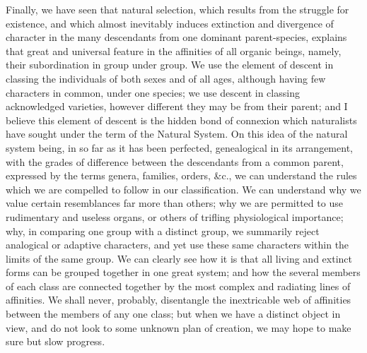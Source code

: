 \indent Finally, we have seen that natural selection, which results from the struggle for existence, and which almost inevitably induces extinction and divergence of character in the many descendants from one dominant parent-species, explains that great and universal feature in the affinities of all organic beings, namely, their subordination in group under group. We use the element of descent in classing the individuals of both sexes and of all ages, although having few characters in common, under one species; we use descent in classing acknowledged varieties, however different they may be from their parent; and I believe this element of descent is the hidden bond of connexion which naturalists have sought under the term of the Natural System. On this idea of the natural system being, in so far as it has been perfected, genealogical in its arrangement, with the grades of difference between the descendants from a common parent, expressed by the terms genera, families, orders, \&c., we can understand the rules which we are compelled to follow in our classification. We can understand why we value certain resemblances far more than others; why we are permitted to use rudimentary and useless organs, or others of trifling physiological importance; why, in comparing one group with a distinct group, we summarily reject analogical or adaptive characters, and yet use these same characters within the limits of the same group. We can clearly see how it is that all living and extinct forms can be grouped together in one great system; and how the several members of each class are connected together by the most complex and radiating lines of affinities. We shall never, probably, disentangle the inextricable web of affinities between the members of any one class; but when we have a distinct object in view, and do not look to some unknown plan of creation, we may hope to make sure but slow progress.~\\

